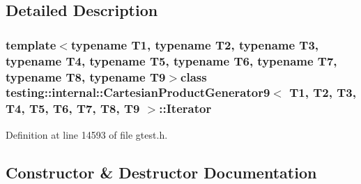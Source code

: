 \subsection{\-Detailed \-Description}
\subsubsection*{template$<$typename T1, typename T2, typename T3, typename T4, typename T5, typename T6, typename T7, typename T8, typename T9$>$class testing\-::internal\-::\-Cartesian\-Product\-Generator9$<$ T1, T2, T3, T4, T5, T6, T7, T8, T9 $>$\-::\-Iterator}



\-Definition at line 14593 of file gtest.\-h.



\subsection{\-Constructor \& \-Destructor \-Documentation}
